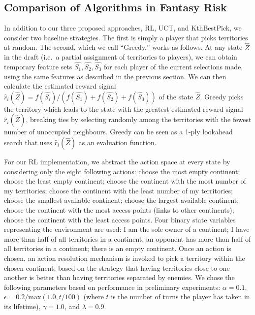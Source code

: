 \documentclass[letterpaper]{article}
\numberwithin{equation}{section}
\numberwithin{theorem}{section}
\numberwithin{lemma}{section}
\numberwithin{df}{section}
\begin{document}
\subsection{Comparison of Algorithms in Fantasy Risk}

In addition to our three proposed approaches, RL, UCT, and KthBestPick, we consider two baseline strategies.  The first is simply a player that picks territories at random.  The second, which we call ``Greedy,'' works as follows.  At any state $\hat{Z}$ in the draft (i.e.~a partial assignment of territories to players), we can obtain temporary feature sets $\hat{S_1}, \hat{S_2}, \hat{S_3}$ for each player of the current selections made, using the same features as described in the previous section.  We can then calculate the estimated reward signal $\hat{r}_i(\hat{Z}) = f(\hat{S_i}) / (f(\hat{S_1}) + f(\hat{S_2}) + f(\hat{S_3}))$ of the state $\hat{Z}$.  Greedy picks the territory which leads to the state with the greatest estimated reward signal $\hat{r}_i(\hat{Z})$, breaking ties by selecting randomly among the territories with the fewest number of unoccupied neighbours.  %
Greedy can be seen as a 1-ply lookahead search that uses $\hat{r}_i(\hat{Z})$ as an evaluation function.

For our RL implementation, we abstract the action space at every state by considering only the eight following actions: choose the most empty continent; choose the least empty continent; choose the continent with the most number of my territories; choose the continent with the least number of my territories; choose the smallest available continent; choose the largest available continent; choose the continent with the most access points (links to other continents); choose the continent with the least access points.  Four binary state variables representing the environment are used: I am the sole owner of a continent; I have more than half of all territories in a continent; an opponent has more than half of all territories in a continent; there is an empty continent.  Once an action is chosen, an action resolution mechanism is invoked to pick a territory within the chosen continent, based on the strategy that having territories close to one another is better than having territories separated by enemies.  We chose the following parameters based on performance in preliminary experiments: $\alpha = 0.1$, $\epsilon = 0.2 / \text{max}(1.0, t/100)$ (where $t$ is the number of turns the player has taken in its lifetime), $\gamma = 1.0$, and $\lambda = 0.9$.
\end{document}
